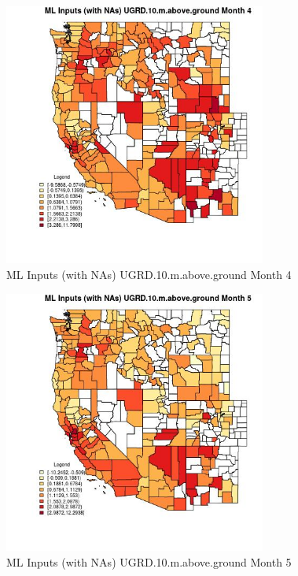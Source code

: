 \begin{figure} 
\centering  
\includegraphics[width=0.77\textwidth]{Code_Outputs/Report_ML_input_PM25_Step4_part_f_de_duplicated_aveswNAs_CountyUGRD10mabovegroundmedianMonth4.jpg} 
\caption{\label{fig:Report_ML_input_PM25_Step4_part_f_de_duplicated_aveswNAsCountyUGRD10mabovegroundmedianMonth4}ML Inputs (with NAs) UGRD.10.m.above.ground Month 4} 
\end{figure} 
 

\begin{figure} 
\centering  
\includegraphics[width=0.77\textwidth]{Code_Outputs/Report_ML_input_PM25_Step4_part_f_de_duplicated_aveswNAs_CountyUGRD10mabovegroundmedianMonth5.jpg} 
\caption{\label{fig:Report_ML_input_PM25_Step4_part_f_de_duplicated_aveswNAsCountyUGRD10mabovegroundmedianMonth5}ML Inputs (with NAs) UGRD.10.m.above.ground Month 5} 
\end{figure} 
 

